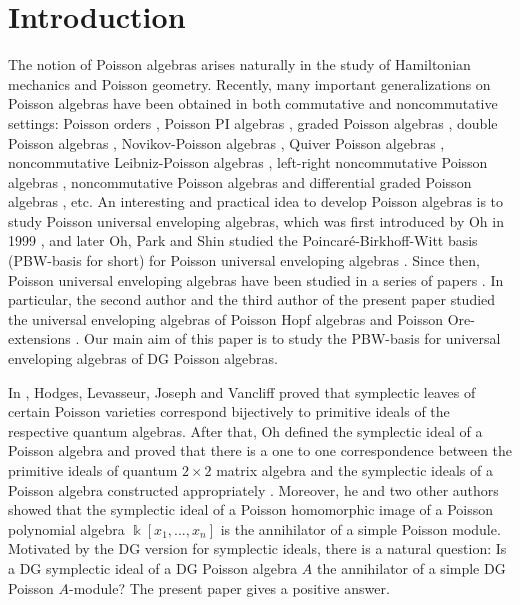 \documentclass[a4paper,10pt]{amsart}
\theoremstyle{definition}
\theoremstyle{remark}
\numberwithin{equation}{section}
\begin{document}
\section{Introduction}
The notion of Poisson algebras arises naturally in the study of Hamiltonian mechanics and Poisson
geometry. Recently, many important generalizations on Poisson algebras have been obtained in both
commutative and noncommutative settings: Poisson orders
\cite{BG}, Poisson PI algebras \cite{MPR}, graded Poisson algebras
\cite{CFL}, double Poisson algebras \cite{V}, Novikov-Poisson
algebras \cite{Xu}, Quiver Poisson algebras \cite{YYZ},
noncommutative Leibniz-Poisson algebras \cite{CD}, left-right
noncommutative Poisson algebras \cite{CDL}, noncommutative Poisson
algebras \cite{X} and differential graded Poisson algebras
\cite{LWZ}, etc. An interesting and practical idea to develop Poisson algebras is to study Poisson universal
enveloping algebras, which was first introduced by Oh in 1999
\cite{O}, and later Oh, Park and Shin studied the
Poincar\'{e}-Birkhoff-Witt basis (PBW-basis for short) for Poisson
universal enveloping algebras \cite{OPS}. Since then, Poisson universal enveloping algebras have been studied in a series of papers \cite{U, YYY}. In particular, the second author and the third author of the present paper studied the universal enveloping algebras of Poisson Hopf algebras and Poisson Ore-extensions \cite{LWZ1, LWZ2}. Our main aim of this paper is
to study the PBW-basis for universal enveloping algebras of
DG Poisson algebras.

In \cite{HL, HLe, J, Va}, Hodges, Levasseur, Joseph and Vancliff proved that symplectic leaves of certain Poisson varieties
correspond bijectively to primitive ideals of the respective quantum algebras. After that, Oh defined the symplectic ideal of a
Poisson algebra and proved that there is a one to one
correspondence between the primitive ideals of quantum $2\times 2$
matrix algebra and the symplectic ideals of a Poisson algebra
constructed appropriately \cite{Oh}. Moreover, he and two other authors showed that the
symplectic ideal of a Poisson homomorphic image of a Poisson polynomial algebra
$\Bbbk[x_1, ..., x_n]$ is the annihilator of a simple Poisson
module. Motivated by the DG version for symplectic ideals, there is a natural question: Is a DG symplectic ideal of a DG Poisson algebra $A$ the annihilator of a simple DG Poisson $A$-module? The present paper gives a positive answer.
\end{document}
